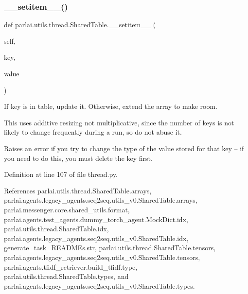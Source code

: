 \mbox{\label{classparlai_1_1utils_1_1thread_1_1SharedTable_a43bc2c55c2125ce9c4848933fadeef5c}} 
\subsubsection{\texorpdfstring{\+\_\+\+\_\+setitem\+\_\+\+\_\+()}{\_\_setitem\_\_()}}
{\footnotesize\ttfamily def parlai.\+utils.\+thread.\+Shared\+Table.\+\_\+\+\_\+setitem\+\_\+\+\_\+ (\begin{DoxyParamCaption}\item[{}]{self,  }\item[{}]{key,  }\item[{}]{value }\end{DoxyParamCaption})}

\begin{DoxyVerb}If key is in table, update it. Otherwise, extend the array to make room.

This uses additive resizing not multiplicative, since the number
of keys is not likely to change frequently during a run, so do not
abuse it.

Raises an error if you try to change the type of the value stored for
that key -- if you need to do this, you must delete the key first.
\end{DoxyVerb}
 

Definition at line 107 of file thread.\+py.



References parlai.\+utils.\+thread.\+Shared\+Table.\+arrays, parlai.\+agents.\+legacy\+\_\+agents.\+seq2seq.\+utils\+\_\+v0.\+Shared\+Table.\+arrays, parlai.\+messenger.\+core.\+shared\+\_\+utils.\+format, parlai.\+agents.\+test\+\_\+agents.\+dummy\+\_\+torch\+\_\+agent.\+Mock\+Dict.\+idx, parlai.\+utils.\+thread.\+Shared\+Table.\+idx, parlai.\+agents.\+legacy\+\_\+agents.\+seq2seq.\+utils\+\_\+v0.\+Shared\+Table.\+idx, generate\+\_\+task\+\_\+\+R\+E\+A\+D\+M\+Es.\+str, parlai.\+utils.\+thread.\+Shared\+Table.\+tensors, parlai.\+agents.\+legacy\+\_\+agents.\+seq2seq.\+utils\+\_\+v0.\+Shared\+Table.\+tensors, parlai.\+agents.\+tfidf\+\_\+retriever.\+build\+\_\+tfidf.\+type, parlai.\+utils.\+thread.\+Shared\+Table.\+types, and parlai.\+agents.\+legacy\+\_\+agents.\+seq2seq.\+utils\+\_\+v0.\+Shared\+Table.\+types.

